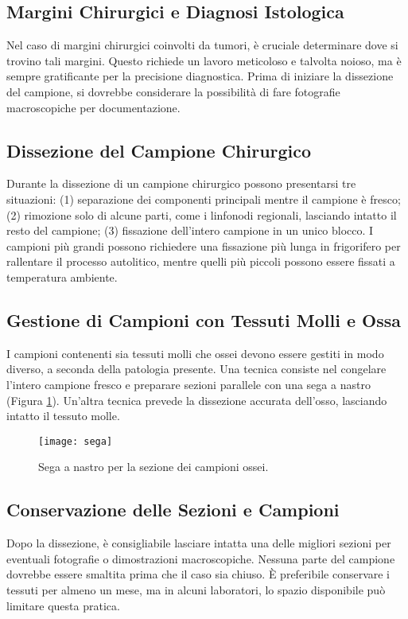 \subsection{Margini Chirurgici e Diagnosi Istologica}
Nel caso di margini chirurgici coinvolti da tumori, è cruciale determinare dove si trovino tali margini. Questo richiede un lavoro meticoloso e talvolta noioso, ma è sempre gratificante per la precisione diagnostica. Prima di iniziare la dissezione del campione, si dovrebbe considerare la possibilità di fare fotografie macroscopiche per documentazione.

\subsection{Dissezione del Campione Chirurgico}
Durante la dissezione di un campione chirurgico possono presentarsi tre situazioni: (1) separazione dei componenti principali mentre il campione è fresco; (2) rimozione solo di alcune parti, come i linfonodi regionali, lasciando intatto il resto del campione; (3) fissazione dell'intero campione in un unico blocco. I campioni più grandi possono richiedere una fissazione più lunga in frigorifero per rallentare il processo autolitico, mentre quelli più piccoli possono essere fissati a temperatura ambiente.

\subsection{Gestione di Campioni con Tessuti Molli e Ossa}
I campioni contenenti sia tessuti molli che ossei devono essere gestiti in modo diverso, a seconda della patologia presente. Una tecnica consiste nel congelare l'intero campione fresco e preparare sezioni parallele con una sega a nastro (Figura \ref{fig:sega}). Un'altra tecnica prevede la dissezione accurata dell'osso, lasciando intatto il tessuto molle.

\begin{figure}[h]
    \centering
    \texttt{[image: sega]}
    \caption{Sega a nastro per la sezione dei campioni ossei.}
    \label{fig:sega}
\end{figure}

\subsection{Conservazione delle Sezioni e Campioni}
Dopo la dissezione, è consigliabile lasciare intatta una delle migliori sezioni per eventuali fotografie o dimostrazioni macroscopiche. Nessuna parte del campione dovrebbe essere smaltita prima che il caso sia chiuso. È preferibile conservare i tessuti per almeno un mese, ma in alcuni laboratori, lo spazio disponibile può limitare questa pratica.

